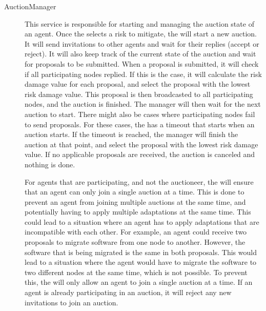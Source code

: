 \begin{description}
    \item[AuctionManager] This service is responsible for starting and managing the auction state of an agent. Once the  selects a risk to mitigate, the  will start a new auction. It will send invitations to other agents and wait for their replies (accept or reject). It will also keep track of the current state of the auction and wait for proposals to be submitted. When a proposal is submitted, it will check if all participating nodes replied. If this is the case, it will calculate the risk damage value for each proposal, and select the proposal with the lowest risk damage value. This proposal is then broadcasted to all participating nodes, and the auction is finished. The manager will then wait for the next auction to start. There might also be cases where participating nodes fail to send proposals. For these cases, the  has a timeout that starts when an auction starts. If the timeout is reached, the manager will finish the auction at that point, and select the proposal with the lowest risk damage value. If no applicable proposals are received, the auction is canceled and nothing is done. 
    
    For agents that are participating, and not the auctioneer, the  will ensure that an agent can only join a single auction at a time. This is done to prevent an agent from joining multiple auctions at the same time, and potentially having to apply multiple adaptations at the same time. This could lead to a situation where an agent has to apply adaptations that are incompatible with each other. For example, an agent could receive two proposals to migrate software from one node to another. However, the software that is being migrated is the same in both proposals. This would lead to a situation where the agent would have to migrate the software to two different nodes at the same time, which is not possible. To prevent this, the  will only allow an agent to join a single auction at a time. If an agent is already participating in an auction, it will reject any new invitations to join an auction. 

\end{description}


